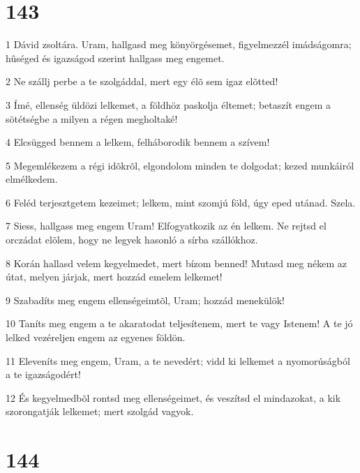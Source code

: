 \chapter{143}

\par 1 Dávid zsoltára. Uram, hallgasd meg könyörgésemet, figyelmezzél imádságomra; hûséged és igazságod szerint hallgass meg engemet.
\par 2 Ne szállj perbe a te szolgáddal, mert egy élõ sem igaz elõtted!
\par 3 Ímé, ellenség üldözi lelkemet, a földhöz paskolja éltemet; betaszít engem a sötétségbe a milyen a régen megholtaké!
\par 4 Elcsügged bennem a lelkem, felháborodik bennem a szívem!
\par 5 Megemlékezem a régi idõkrõl, elgondolom minden te dolgodat; kezed munkáiról elmélkedem.
\par 6 Feléd terjesztgetem kezeimet; lelkem, mint szomjú föld, úgy eped utánad. Szela.
\par 7 Siess, hallgass meg engem Uram! Elfogyatkozik az én lelkem. Ne rejtsd el orczádat elõlem, hogy ne legyek hasonló a sírba szállókhoz.
\par 8 Korán hallasd velem kegyelmedet, mert bízom benned! Mutasd meg nékem az útat, melyen járjak, mert hozzád emelem lelkemet!
\par 9 Szabadíts meg engem ellenségeimtõl, Uram; hozzád menekülök!
\par 10 Taníts meg engem a te akaratodat teljesítenem, mert te vagy Istenem! A te jó lelked vezéreljen engem az egyenes földön.
\par 11 Eleveníts meg engem, Uram, a te nevedért; vidd ki lelkemet a nyomorúságból a te igazságodért!
\par 12 És kegyelmedbõl rontsd meg ellenségeimet, és veszítsd el mindazokat, a kik szorongatják lelkemet; mert szolgád vagyok.

\chapter{144}

